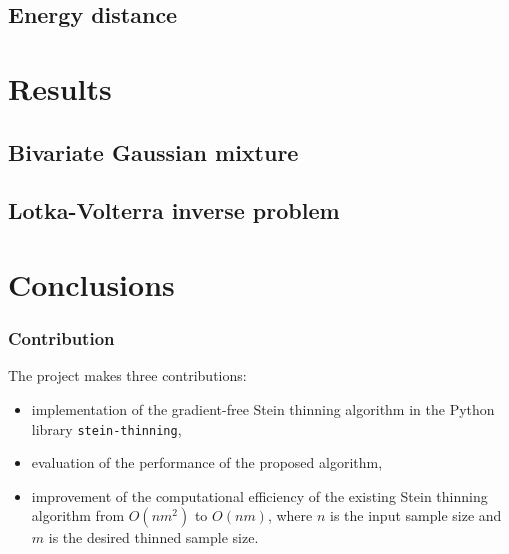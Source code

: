 \documentclass{beamer}
\begin{document}
\subsection{Energy distance}

\section{Results}

\subsection{Bivariate Gaussian mixture}

\subsection{Lotka-Volterra inverse problem}

\section{Conclusions}

\begin{frame}
\frametitle{Contribution}

The project makes three contributions:
\begin{itemize}
\item implementation of the gradient-free Stein thinning algorithm in the Python library \texttt{stein-thinning},
\item evaluation of the performance of the proposed algorithm,
\item improvement of the computational efficiency of the existing Stein thinning algorithm from $O(nm^2)$ to $O(nm)$, where $n$ is the input sample size and $m$ is the desired thinned sample size.
\end{itemize}

\end{frame}
\end{document}
